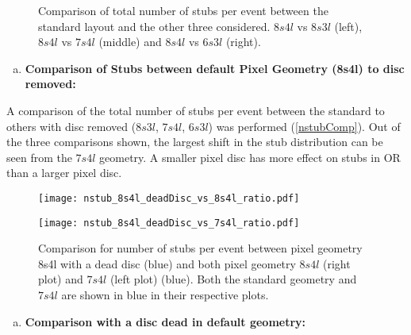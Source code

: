 \begin{figure}[H]
    \centering
     \caption{Comparison of total number of stubs per event between the standard layout and the other three considered. $8s4l$ vs $8s3l$ (left), $8s4l$ vs $7s4l$ (middle) and $8s4l$ vs $6s3l$ (right).}
\label{nstubComp}
\end{figure}

\vspace{1em}

\begin{enumerate}[(a),resume]	
	\item{\textbf{Comparison of Stubs between default Pixel Geometry (8s4l) to disc removed:}}
\end{enumerate}

A comparison of the total number of stubs per event between the standard to others with disc removed ($8s3l$, $7s4l$, $6s3l$) was performed (\autoref{nstubComp}). Out of the three comparisons shown, the largest shift in the stub distribution can be seen from the $7s4l$ geometry. A smaller pixel disc has more effect on stubs in OR than a larger pixel disc.\\

\begin{figure}[H]
\begin{center}
\begin{minipage}[b]{0.45\textwidth}
\texttt{[image: nstub\_8s4l\_deadDisc\_vs\_8s4l\_ratio.pdf]} 
\end{minipage}
\hspace{1em}
\begin{minipage}[b]{0.45\textwidth}
\texttt{[image: nstub\_8s4l\_deadDisc\_vs\_7s4l\_ratio.pdf]} 
\end{minipage}
\caption{Comparison for number of stubs per event between pixel geometry 8s4l with a dead disc (blue) and both pixel geometry $8s4l$ (right plot) and $7s4l$ (left plot) (blue). Both the standard geometry and $7s4l$ are shown in blue in their respective plots.}
\label{nstubdeadDisc} 
\end{center}
\end{figure}

\begin{enumerate}[(a),resume]
\item{\textbf{Comparison with a disc dead in default geometry:}}
\end{enumerate}

